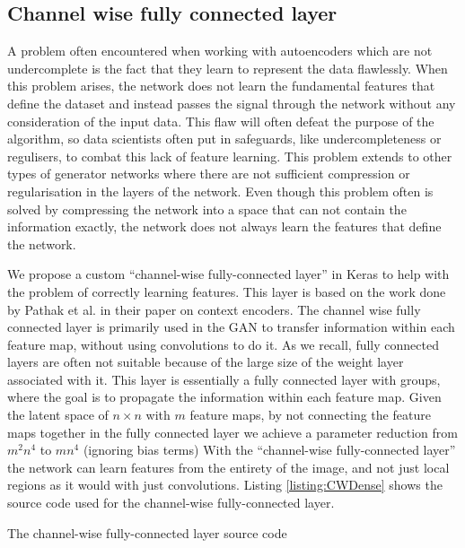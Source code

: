 \subsection{Channel wise fully connected layer}
\label{cha:CWDense}
A problem often encountered when working with autoencoders which are not undercomplete is the fact that they learn to represent the data flawlessly. \cite{OvercompleteAE} 
When this problem arises, the network does not learn the fundamental features that define the dataset and instead passes the signal through the network without any consideration of the input data.
This flaw will often defeat the purpose of the algorithm, so data scientists often put in safeguards, like undercompleteness or regulisers, to combat this lack of feature learning. 
This problem extends to other types of generator networks where there are not sufficient compression or regularisation in the layers of the network.
Even though this problem often is solved by compressing the network into a space that can not contain the information exactly, the network does not always learn the features that define the network. 

We propose a custom ``channel-wise fully-connected layer'' in Keras to help with the problem of correctly learning features. This layer is based on the work done by Pathak et al. in their paper on context encoders\cite{Pathak_2016}.
The channel wise fully connected layer is primarily used in the GAN to transfer information within each feature map, without using convolutions to do it. As we recall, fully connected layers are often not suitable because of the large size of the weight layer associated with it. This layer is essentially a fully connected layer with groups, where the goal is to propagate the information within each feature map.
Given the latent space of $n \times n$ with $m$ feature maps, by not connecting the feature maps together in the fully connected layer we achieve a parameter reduction from $m^2n^4$ to $mn^4$ (ignoring bias terms) \cite{Pathak_2016}
With the ``channel-wise fully-connected layer'' the network can learn features from the entirety of the image, and not just local regions as it would with just convolutions. 
Listing \ref{listing:CWDense} shows the source code used for the channel-wise fully-connected layer.

\begin{listing}

\caption{The channel-wise fully-connected layer source code}
\label{listing:CWDense}
\end{listing}

